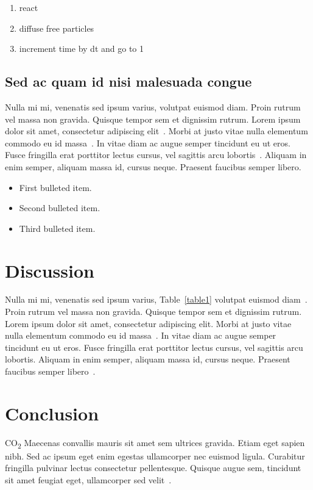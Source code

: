 \documentclass[10pt,letterpaper]{article}
\begin{document}
\begin{enumerate}
	\item react
	\item diffuse free particles
	\item increment time by dt and go to 1
\end{enumerate}


\subsection*{Sed ac quam id nisi malesuada congue}

Nulla mi mi, venenatis sed ipsum varius, volutpat euismod diam. Proin rutrum vel massa non gravida. Quisque tempor sem et dignissim rutrum. Lorem ipsum dolor sit amet, consectetur adipiscing elit~\cite{bib7}. Morbi at justo vitae nulla elementum commodo eu id massa~\cite{bib8}. In vitae diam ac augue semper tincidunt eu ut eros. Fusce fringilla erat porttitor lectus cursus, vel sagittis arcu lobortis~\cite{bib9}. Aliquam in enim semper, aliquam massa id, cursus neque. Praesent faucibus semper libero.

\begin{itemize}
	\item First bulleted item.
	\item Second bulleted item.
	\item Third bulleted item.
\end{itemize}

\section*{Discussion}
Nulla mi mi, venenatis sed ipsum varius, Table~\ref{table1} volutpat euismod diam~\cite{bib10}. Proin rutrum vel massa non gravida. Quisque tempor sem et dignissim rutrum. Lorem ipsum dolor sit amet, consectetur adipiscing elit. Morbi at justo vitae nulla elementum commodo eu id massa~\cite{bib11}. In vitae diam ac augue semper tincidunt eu ut eros. Fusce fringilla erat porttitor lectus cursus, vel sagittis arcu lobortis. Aliquam in enim semper, aliquam massa id, cursus neque. Praesent faucibus semper libero~\cite{bib12}.

\section*{Conclusion}

CO\textsubscript{2} Maecenas convallis mauris sit amet sem ultrices gravida. Etiam eget sapien nibh. Sed ac ipsum eget enim egestas ullamcorper nec euismod ligula. Curabitur fringilla pulvinar lectus consectetur pellentesque. Quisque augue sem, tincidunt sit amet feugiat eget, ullamcorper sed velit~\cite{bib13}. 
\end{document}
